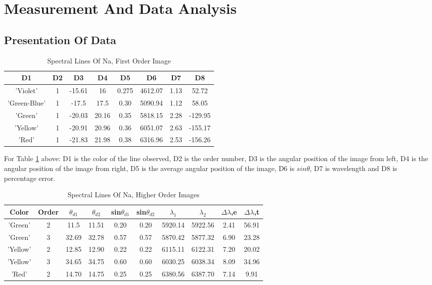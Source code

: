 \section{Measurement And Data Analysis}

	\subsection{Presentation Of Data}
	
		\begin{table}[h!]
			\begin{tabular}{||c c c c c c c c||} 
				\hline
				D1 & D2 & D3 & D4 & D5 & D6 & D7 & D8 \\ [0.5ex] 
				\hline\hline
				'Violet'& 1& -15.61& 16& 0.275& 4612.07& 1.13& 52.72 \\
				\hline
				'Green-Blue'& 1& -17.5& 17.5& 0.30& 5090.94& 1.12& 58.05 \\
				\hline
				'Green'& 1& -20.03& 20.16& 0.35& 5818.15& 2.28& -129.95 \\
				\hline
				'Yellow'& 1& -20.91& 20.96& 0.36& 6051.07& 2.63& -155.17 \\
				\hline
				'Red'& 1& -21.83& 21.98& 0.38& 6316.96& 2.53& -156.26 \\ [1ex]  
				\hline
			\end{tabular}
	\caption{Spectral Lines Of Na, First Order Image}
	\label{table:Data1}
	\end{table}
For Table \ref{table:Data1} above: D1 is the color of the line observed, D2 is the order number, D3 is the angular position of the image from left, D4 is the angular position of the image from right, D5 is the average angular position of the image, D6 is $sin\theta$, D7 is wavelength and D8 is percentage error.
	\begin{center}
	\begin{table}[h!]
		\begin{tabular}{||c c c c c c c c c c||} 
			\hline
			Color & Order & $\theta_{d1}$ & $\theta_{d2}$ & sin$\theta_{d1}$ & sin$\theta_{d2}$ & $\lambda_1$ & $\lambda_2$ & $\Delta \lambda$,e & $\Delta \lambda$,t \\ [0.5ex] 
			\hline\hline
			'Green'& 2& 11.5& 11.51& 0.20& 0.20& 5920.14& 5922.56& 2.41& 56.91 \\
			\hline
			'Green'& 3& 32.69& 32.78& 0.57& 0.57& 5870.42& 5877.32& 6.90& 23.28 \\
			\hline
			'Yellow'& 2& 12.85& 12.90& 0.22& 0.22& 6115.11& 6122.31& 7.20& 20.02 \\
			\hline
			'Yellow'& 3& 34.65& 34.75& 0.60& 0.60& 6030.25& 6038.34& 8.09& 34.96 \\
			\hline
			'Red'& 2& 14.70& 14.75& 0.25& 0.25& 6380.56& 6387.70& 7.14& 9.91 \\
			\hline
		\end{tabular}
		\caption{Spectral Lines Of Na, Higher Order Images}
		\label{table:Data2}
	\end{table}
\end{center}
	
